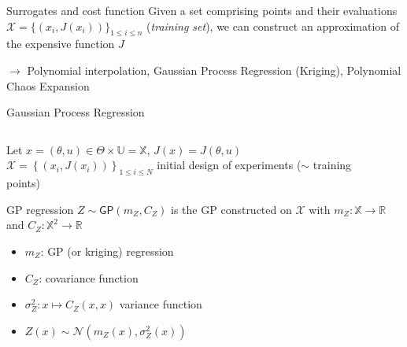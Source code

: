 \documentclass[10pt,aspectratio=169,usepdftitle=false]{beamer}
\newcommand\manupath{/home/victor/acadwriting/Manuscrit/Text/}
\newcommand{\Uspace}{\mathbb{U}}
\newcommand{\Kspace}{\Theta}
\newcommand{\Xspace}{\mathbb{X}}
\newcommand{\GP}{\mathsf{GP}}
\newcommand{\kk}{\theta}
\newcommand{\uu}{u}
\newcommand{\inputpgf}[2][\textwidth]{
  \renewcommand\rmfamily{\sffamily}
  \resizebox{#1}{!}{}}
\begin{document}
\begin{frame}{Surrogates and cost function}
  Given a set comprising points and their evaluations
  $\mathcal{X} = \{(x_i,J(x_i))\}_{1 \leq i \leq n}$ (\textit{training set}), we can construct
  an \alert{approximation} of the expensive function $J$

  
  $\rightarrow$ Polynomial interpolation, \alert<2>{Gaussian Process Regression (Kriging)}, Polynomial Chaos Expansion
\end{frame}

\begin{frame}{Gaussian Process Regression}
  \begin{columns}
    \begin{column}{0.5\textwidth}   
  Let $x = (\kk, \uu) \in \Kspace \times \Uspace = \Xspace$, $J(x)= J(\kk, \uu)$
  $\mathcal{X} = \left\{ (x_i, J(x_i)) \right\}_{1 \leq i \leq N}$ initial design of experiments ($\sim$ training points)
  \begin{block}{GP regression \citep{matheron_traite_1962,krige_statistical_1951}}
    $Z \sim \GP\left(m_Z,C_Z\right)$ is the GP constructed on $\mathcal{X}$
    with $m_Z: \Xspace \rightarrow \mathbb{R}$ and $C_Z: \Xspace^2 \rightarrow \mathbb{R}$
    \begin{itemize}
    \item $m_Z$: GP (or kriging) regression
    \item $C_Z$: covariance function
    \item  $\sigma_Z^2: x \mapsto C_Z(x, x)$ variance function
    \item \alert<2>{$Z(x)\sim \mathcal{N}\left(m_Z(x), \sigma^2_Z(x)\right)$}
    \end{itemize}
  \end{block}
  \end{column}
    \begin{column}{0.5\textwidth}
    \begin{center}
      \inputpgf{\manupath Chapter4/img/example_GP_J.pgf}
  \end{center}
\end{column}
\end{columns}
\end{frame}
\end{document}
